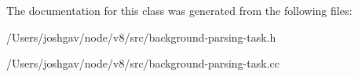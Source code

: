 The documentation for this class was generated from the following files\+:\begin{DoxyCompactItemize}
\item 
/\+Users/joshgav/node/v8/src/background-\/parsing-\/task.\+h\item 
/\+Users/joshgav/node/v8/src/background-\/parsing-\/task.\+cc\end{DoxyCompactItemize}
